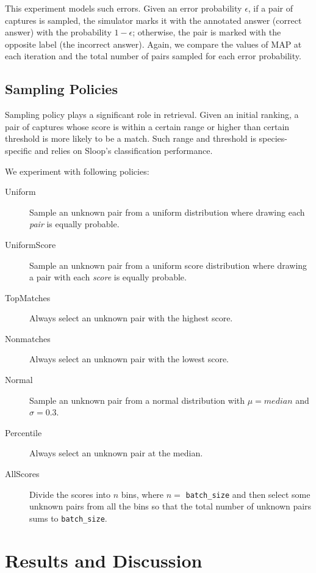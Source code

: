 This experiment models such errors. Given an error probability $\epsilon$, if
a pair of captures is sampled, the simulator marks it with the annotated answer
(correct answer) with the probability $1-\epsilon$; otherwise, the pair is
marked with the opposite label (the incorrect answer). Again, we compare the values
of MAP at each iteration and the total number of pairs sampled for each error
probability.

\subsection{Sampling Policies} %
\label{sub:sampling_policies}

Sampling policy plays a significant role in retrieval. Given an initial
ranking, a pair of captures whose score is within a certain range or higher
than certain threshold is more likely to be a match. Such range and threshold
is species-specific and relies on Sloop's classification performance.

We experiment with following policies:
\begin{description}
  \item [Uniform]
  Sample an unknown pair from a uniform distribution where drawing each
    \emph{pair} is equally probable.
  \item [UniformScore]
  Sample an unknown pair from a uniform score distribution where drawing a pair
    with each \emph{score} is equally probable.
  \item [TopMatches]
  Always select an unknown pair with the highest score.
  \item [Nonmatches]
  Always select an unknown pair with the lowest score.
  \item [Normal]
  Sample an unknown pair from a normal distribution with $\mu=median$ and
    $\sigma=0.3$.
  \item [Percentile]
  Always select an unknown pair at the median.
  \item [AllScores]
  Divide the scores into $n$ bins, where $n=$ \texttt{batch\_size} and then
  select some unknown pairs from all the bins so that the total number of
  unknown pairs sums to \texttt{batch\_size}.
\end{description}



\section{Results and Discussion} %
\label{sec:results}

